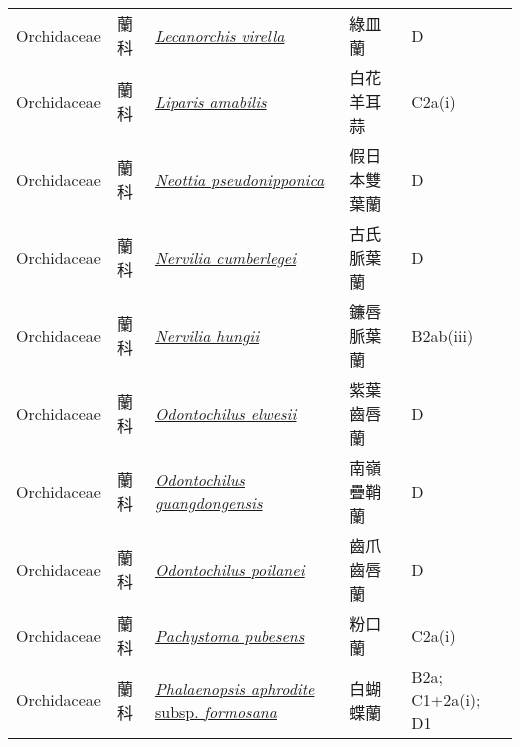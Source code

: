 {\begin{longtable}{p{2.5cm}p{2cm}p{5cm}p{2.5cm}p{3cm}}
    Orchidaceae & 蘭科 & \href{http://www.theplantlist.org/tpl1.1/search?q=Lecanorchis+virella}{\textit{Lecanorchis virella} } & 綠皿蘭 & D \index{Lecanorchis@\textit{Lecanorchis}!virella@\textit{virella}}  \index{綠皿蘭} \\
    Orchidaceae & 蘭科 & \href{http://www.theplantlist.org/tpl1.1/search?q=Liparis+amabilis}{\textit{Liparis amabilis} } & 白花羊耳蒜 & C2a(i) \index{Liparis@\textit{Liparis}!amabilis@\textit{amabilis}}  \index{白花羊耳蒜} \\
    Orchidaceae & 蘭科 & \href{http://www.theplantlist.org/tpl1.1/search?q=Neottia+pseudonipponica}{\textit{Neottia pseudonipponica} } & 假日本雙葉蘭 & D \index{Neottia@\textit{Neottia}!pseudonipponica@\textit{pseudonipponica}}  \index{假日本雙葉蘭} \\
    Orchidaceae & 蘭科 & \href{http://www.theplantlist.org/tpl1.1/search?q=Nervilia+cumberlegei}{\textit{Nervilia cumberlegei} } & 古氏脈葉蘭 & D \index{Nervilia@\textit{Nervilia}!cumberlegei@\textit{cumberlegei}}  \index{古氏脈葉蘭} \\
    Orchidaceae & 蘭科 & \href{http://www.theplantlist.org/tpl1.1/search?q=Nervilia+hungii}{\textit{Nervilia hungii} } & 鐮唇脈葉蘭 & B2ab(iii) \index{Nervilia@\textit{Nervilia}!hungii@\textit{hungii}}  \index{鐮唇脈葉蘭} \\
    Orchidaceae & 蘭科 & \href{http://www.theplantlist.org/tpl1.1/search?q=Odontochilus+elwesii}{\textit{Odontochilus elwesii} } & 紫葉齒唇蘭 & D \index{Odontochilus@\textit{Odontochilus}!elwesii@\textit{elwesii}}  \index{紫葉齒唇蘭} \\
    Orchidaceae & 蘭科 & \href{http://www.theplantlist.org/tpl1.1/search?q=Odontochilus+guangdongensis}{\textit{Odontochilus guangdongensis} } & 南嶺疊鞘蘭 & D \index{Odontochilus@\textit{Odontochilus}!guangdongensis@\textit{guangdongensis}}  \index{南嶺疊鞘蘭} \\
    Orchidaceae & 蘭科 & \href{http://www.theplantlist.org/tpl1.1/search?q=Odontochilus+poilanei}{\textit{Odontochilus poilanei} } & 齒爪齒唇蘭 & D \index{Odontochilus@\textit{Odontochilus}!poilanei@\textit{poilanei}}  \index{齒爪齒唇蘭} \\
    Orchidaceae & 蘭科 & \href{http://www.theplantlist.org/tpl1.1/search?q=Pachystoma+pubesens}{\textit{Pachystoma pubesens} } & 粉口蘭 & C2a(i) \index{Pachystoma@\textit{Pachystoma}!pubesens@\textit{pubesens}}  \index{粉口蘭} \\
    Orchidaceae & 蘭科 & \href{http://www.theplantlist.org/tpl1.1/search?q=Phalaenopsis+aphrodite+subsp.+formosana}{\textit{Phalaenopsis aphrodite} subsp. \textit{formosana} } & 白蝴蝶蘭 & B2a; C1+2a(i); D1 \index{Phalaenopsis@\textit{Phalaenopsis}!aphrodite@\textit{aphrodite}!subsp. formosana@subsp. \textit{formosana}}  \index{白蝴蝶蘭} \\

\end{longtable}}
